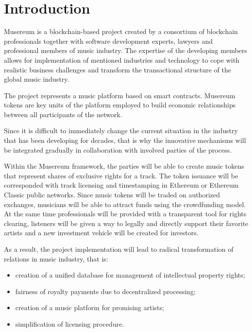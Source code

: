 \documentclass[12pt]{report}
\begin{document}
\pagebreak
\tableofcontents
\pagebreak

\chapter{Introduction}
\label{overview}
Musereum is a blockchain-based project created by a consortium of blockchain professionals together with software development experts, lawyers and professional members of music industry. The expertise of the developing members allows for implementation of mentioned industries and technology to cope with realistic business challenges and transform the transactional structure of the global music industry.

The project represents a music platform based on smart contracts. Musereum tokens are key units of the platform employed to build economic relationships between all participants of the network.

Since it is difficult to immediately change the current situation in the industry that has been developing for decades, that is why the innovative mechanisms will be integrated gradually in collaboration with involved parties of the process.

Within the Musereum framework, the parties will be able to create music tokens that represent shares of exclusive rights for a track. The token issuance will be corresponded with track licensing and timestamping in Ethereum or Ethereum Classic public networks. Since music tokens will be traded on authorized exchanges, musicians will be able to attract funds using the crowdfunding model. At the same time professionals will be provided with a transparent tool for rights clearing, listeners will be given a way to legally and directly support their favorite artists and a new investment vehicle will be created for investors.

As a result, the project implementation will lead to radical transformation of relations in music industry, that is:

\begin{itemize}
	\item  creation of a unified database for management of intellectual property rights;
	\item fairness of royalty payments due to decentralized processing;
	\item creation of a music platform for promising artists;
	\item simplification of licensing procedure.
\end{itemize}
\end{document}
